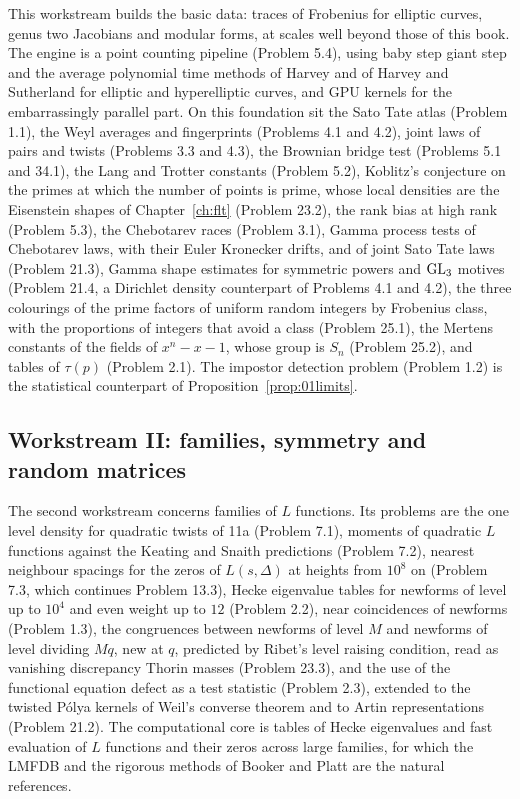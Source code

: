 This workstream builds the basic data: traces of Frobenius for elliptic curves, genus two Jacobians and modular forms, at scales well beyond those of this book. The engine is a point counting pipeline (Problem 5.4), using baby step giant step and the average polynomial time methods of Harvey \cite{harvey2014} and of Harvey and Sutherland \cite{harveysutherland2014} for elliptic and hyperelliptic curves, and GPU kernels for the embarrassingly parallel part. On this foundation sit the Sato Tate atlas (Problem 1.1), the Weyl averages and fingerprints (Problems 4.1 and 4.2), joint laws of pairs and twists (Problems 3.3 and 4.3), the Brownian bridge test (Problems 5.1 and 34.1), the Lang and Trotter constants (Problem 5.2), Koblitz's conjecture on the primes at which the number of points is prime, whose local densities are the Eisenstein shapes of Chapter~\ref{ch:flt} (Problem 23.2), the rank bias at high rank (Problem 5.3), the Chebotarev races (Problem 3.1), Gamma process tests of Chebotarev laws, with their Euler Kronecker drifts, and of joint Sato Tate laws (Problem 21.3), Gamma shape estimates for symmetric powers and $\mathrm{GL}_3$ motives (Problem 21.4, a Dirichlet density counterpart of Problems 4.1 and 4.2), the three colourings of the prime factors of uniform random integers by Frobenius class, with the proportions of integers that avoid a class (Problem 25.1), the Mertens constants of the fields of $x^n-x-1$, whose group is $S_n$ (Problem 25.2), and tables of $\tau(p)$ (Problem 2.1). The impostor detection problem (Problem 1.2) is the statistical counterpart of Proposition~\ref{prop:01limits}.

\subsection{Workstream II: families, symmetry and random matrices}

The second workstream concerns families of $L$ functions. Its problems are the one level density for quadratic twists of 11a (Problem 7.1), moments of quadratic $L$ functions against the Keating and Snaith predictions (Problem 7.2), nearest neighbour spacings for the zeros of $L(s,\Delta)$ at heights from $10^8$ on (Problem 7.3, which continues Problem 13.3), Hecke eigenvalue tables for newforms of level up to $10^4$ and even weight up to $12$ (Problem 2.2), near coincidences of newforms (Problem 1.3), the congruences between newforms of level $M$ and newforms of level dividing $Mq$, new at $q$, predicted by Ribet's level raising condition, read as vanishing discrepancy Thorin masses (Problem 23.3), and the use of the functional equation defect as a test statistic (Problem 2.3), extended to the twisted P\'olya kernels of Weil's converse theorem and to Artin representations (Problem 21.2). The computational core is tables of Hecke eigenvalues and fast evaluation of $L$ functions and their zeros across large families, for which the LMFDB \cite{lmfdb} and the rigorous methods of Booker and Platt are the natural references.

